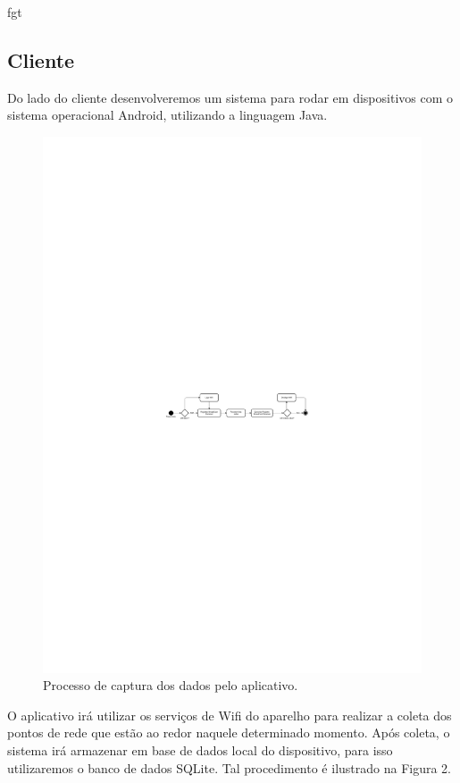 fgt\documentclass[12pt, %
openright, 
oneside, %
a4paper,    %
brazil]{facom-ufu-abntex2}
\begin{document}
\subsection{Cliente}
Do lado do cliente desenvolveremos um sistema para rodar em dispositivos com o sistema operacional Android, utilizando a linguagem Java.

\begin{figure}[hbt]
  \includegraphics [scale=.4] {pherocast1}
  \caption{Processo de captura dos dados pelo aplicativo.}
\end{figure}

O aplicativo irá utilizar os serviços de Wifi do aparelho para realizar a coleta dos pontos de rede que estão ao redor naquele determinado momento. Após coleta, o sistema irá armazenar em base de dados local do dispositivo, para isso utilizaremos o banco de dados SQLite. Tal procedimento é ilustrado na Figura 2.
\end{document}
